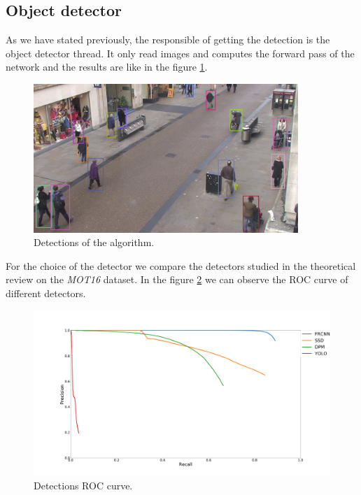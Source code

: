 \documentclass[12pt, a4paper, titlepage,twoside,openright]{article}
\begin{document}
\subsection{Object detector}


As we have stated previously, the responsible of getting the detection is the object detector thread. It only read images and computes the forward pass of the network and the results are like in the figure \ref{objectDetector1}.

\begin{figure}[H]
\centering         
\includegraphics[width=10cm]{intro/deteccions.jpg}
\caption{Detections of the algorithm.} \label{objectDetector1}
\end{figure}



%

For the choice of the detector we compare the detectors studied in the theoretical review on the \textit{MOT16} dataset. In the figure \ref{objectDetector2} we can observe the ROC curve of different detectors.


\begin{figure}[h!]
\centering         
\includegraphics[width=15cm]{objectDetection/det.png}
\caption{Detections ROC curve.} \label{objectDetector2}
\end{figure}
\end{document}
